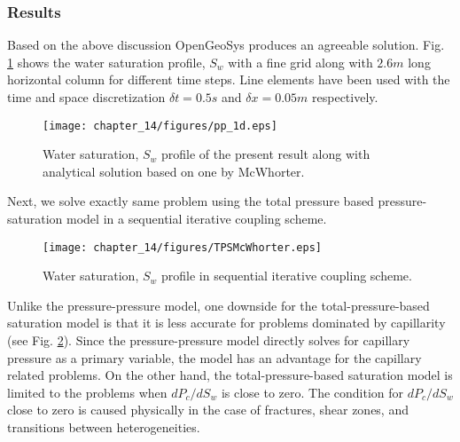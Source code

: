 \subsubsection*{Results}
Based on the above discussion OpenGeoSys produces an agreeable solution. Fig. \ref{mcwt:ppModel} shows the water saturation profile, $S_w$ with a fine grid along with $2.6m$ long horizontal column for different time steps. Line elements have been used with the time and space discretization $\delta t=0.5s$ and $\delta x=0.05m$ respectively.

\begin{figure}[H]
\begin{center}
\texttt{[image: chapter\_14/figures/pp\_1d.eps]}
\end{center}
\vspace{-0.4cm}
\caption{Water saturation, $S_w$ profile of the present result along with analytical solution based on one by McWhorter.}
\label{mcwt:ppModel}
\end{figure}

Next, we solve exactly same problem using the total pressure based pressure-saturation model in a sequential iterative coupling scheme.

\begin{figure}[H]
\begin{center}
\texttt{[image: chapter\_14/figures/TPSMcWhorter.eps]}
\end{center}
\caption{Water saturation, $S_w$ profile in sequential iterative coupling scheme.}
\label{mcwt:psModel}
\end{figure}

Unlike the pressure-pressure model, one downside for the total-pressure-based saturation model is that it is less accurate for problems dominated by capillarity (see Fig. \ref{mcwt:psModel}). Since the pressure-pressure model directly solves for capillary pressure as a primary variable, the model has an advantage for the capillary related problems. On the other hand, the total-pressure-based saturation model is limited to the problems when $d P_c/d S_w$ is close to zero. The condition for $d P_c/d S_w$ close to zero is caused physically in the case of fractures, shear zones, and transitions between heterogeneities.

